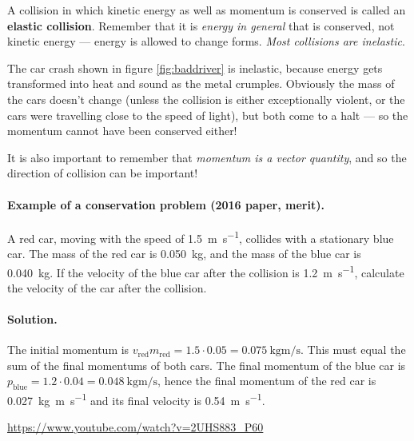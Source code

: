\documentclass[a4paper]{amsbook}
\begin{document}
A collision in which kinetic energy as well as momentum is conserved is called an \textbf{elastic collision}. Remember that it is \emph{energy in general} that
is conserved, not kinetic energy --- energy is allowed to change forms. \emph{Most collisions are inelastic}.

The car crash shown in figure \ref{fig:baddriver} is inelastic, because energy gets transformed into heat and sound as the metal
crumples. Obviously the mass of the cars doesn't change (unless the collision is either exceptionally violent, or the cars were
travelling close to the speed of light), but both come to a halt --- so the momentum cannot have been conserved either!

It is also important to remember that \emph{momentum is a vector quantity}, and so the direction of collision can be important!

\paragraph{Example of a conservation problem (2016 paper, merit).} A red car, moving with the speed of \SI{1.5}{\metre\per\second},
collides with a stationary blue car. The mass of the red car is \SI{0.050}{\kilo\gram}, and the mass of the blue car is
\SI{0.040}{\kilo\gram}. If the velocity of the blue car after the collision is \SI{1.2}{\metre\per\second}, calculate the
velocity of the car after the collision.

\paragraph{Solution.} The initial momentum is $ v_{\text{red}} m_{\text{red}} = 1.5 \cdot 0.05 = \SI{0.075}{\kilo\gram\metre\per\second} $.
This must equal the sum of the final momentums of both cars. The final momentum of the blue car is $ p_{\text{blue}} = 1.2 \cdot 0.04 =
\SI{0.048}{\kilo\gram\metre\per\second} $, hence the final momentum of the red car is \SI{0.027}{\kilo\gram\metre\per\second} and its
final velocity is \SI{0.54}{\metre\per\second}.

\begin{center}
\begin{tcolorbox}[width=0.8\textwidth,colback={red},title={\textbf{Go and watch...}},colbacktitle=yellow,coltitle=blue]
  \textcolor{white}{\url{https://www.youtube.com/watch?v=2UHS883_P60}}
\end{tcolorbox}
\end{center}
\end{document}
